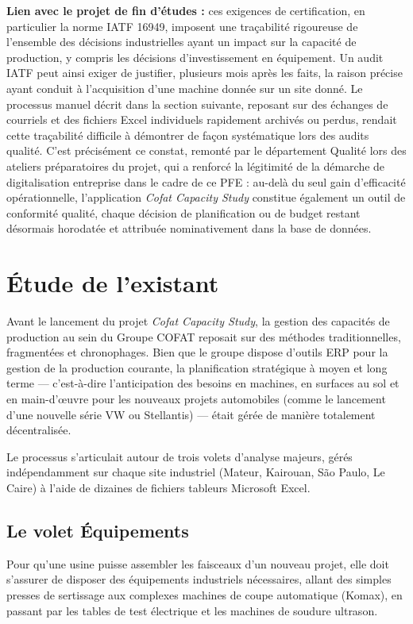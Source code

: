 \textbf{Lien avec le projet de fin d'études :} ces exigences de certification, en particulier la norme IATF 16949, imposent une traçabilité rigoureuse de l'ensemble des décisions industrielles ayant un impact sur la capacité de production, y compris les décisions d'investissement en équipement. Un audit IATF peut ainsi exiger de justifier, plusieurs mois après les faits, la raison précise ayant conduit à l'acquisition d'une machine donnée sur un site donné. Le processus manuel décrit dans la section suivante, reposant sur des échanges de courriels et des fichiers Excel individuels rapidement archivés ou perdus, rendait cette traçabilité difficile à démontrer de façon systématique lors des audits qualité. C'est précisément ce constat, remonté par le département Qualité lors des ateliers préparatoires du projet, qui a renforcé la légitimité de la démarche de digitalisation entreprise dans le cadre de ce PFE : au-delà du seul gain d'efficacité opérationnelle, l'application \textit{Cofat Capacity Study} constitue également un outil de conformité qualité, chaque décision de planification ou de budget restant désormais horodatée et attribuée nominativement dans la base de données.

\section{Étude de l'existant}
Avant le lancement du projet \textit{Cofat Capacity Study}, la gestion des capacités de production au sein du Groupe COFAT reposait sur des méthodes traditionnelles, fragmentées et chronophages. Bien que le groupe dispose d'outils ERP pour la gestion de la production courante, la planification stratégique à moyen et long terme — c'est-à-dire l'anticipation des besoins en machines, en surfaces au sol et en main-d'œuvre pour les nouveaux projets automobiles (comme le lancement d'une nouvelle série VW ou Stellantis) — était gérée de manière totalement décentralisée.

Le processus s'articulait autour de trois volets d'analyse majeurs, gérés indépendamment sur chaque site industriel (Mateur, Kairouan, São Paulo, Le Caire) à l'aide de dizaines de fichiers tableurs Microsoft Excel.

\subsection{Le volet Équipements}
Pour qu'une usine puisse assembler les faisceaux d'un nouveau projet, elle doit s'assurer de disposer des équipements industriels nécessaires, allant des simples presses de sertissage aux complexes machines de coupe automatique (Komax), en passant par les tables de test électrique et les machines de soudure ultrason.

